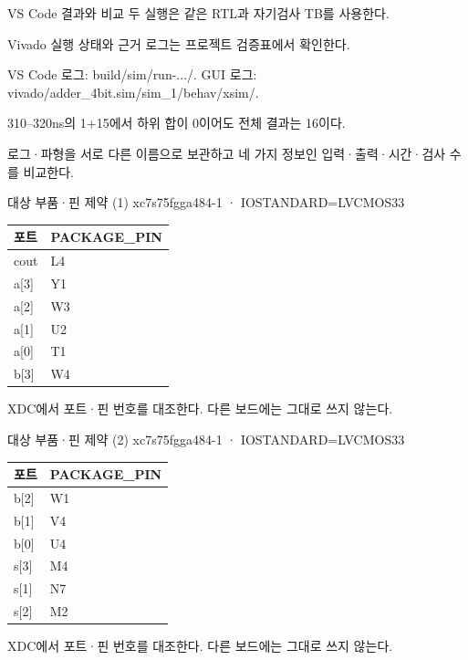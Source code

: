 \begin{frame}{VS Code 결과와 비교}\relax
\small
두 실행은 같은 RTL과 자기검사 TB를 사용한다.\par\vspace{0.22cm}Vivado 실행 상태와 근거 로그는 프로젝트 검증표에서 확인한다.\par\vspace{0.22cm}VS Code 로그: build/sim/run-.../. GUI 로그: vivado/adder\_4bit.sim/sim\_1/behav/xsim/.\par\vspace{0.22cm}310–320ns의 1+15에서 하위 합이 0이어도 전체 결과는 16이다.\par\vspace{0.22cm}로그·파형을 서로 다른 이름으로 보관하고 네 가지 정보인 입력·출력·시간·검사 수를 비교한다.\par
\end{frame}

\begin{frame}{대상 부품·핀 제약 (1)}\relax
\small
xc7s75fgga484-1 · IOSTANDARD=LVCMOS33\par\begin{center}\renewcommand{\arraystretch}{1.45}
\begin{tabular}{l|l}
포트 & PACKAGE\_PIN\\\hline
cout & L4\\
a[3] & Y1\\
a[2] & W3\\
a[1] & U2\\
a[0] & T1\\
b[3] & W4\\
\end{tabular}\end{center}
XDC에서 포트·핀 번호를 대조한다. 다른 보드에는 그대로 쓰지 않는다.\par
\end{frame}

\begin{frame}{대상 부품·핀 제약 (2)}\relax
\small
xc7s75fgga484-1 · IOSTANDARD=LVCMOS33\par\begin{center}\renewcommand{\arraystretch}{1.45}
\begin{tabular}{l|l}
포트 & PACKAGE\_PIN\\\hline
b[2] & W1\\
b[1] & V4\\
b[0] & U4\\
s[3] & M4\\
s[1] & N7\\
s[2] & M2\\
\end{tabular}\end{center}
XDC에서 포트·핀 번호를 대조한다. 다른 보드에는 그대로 쓰지 않는다.\par
\end{frame}

